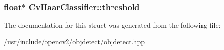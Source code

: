 \hypertarget{structCvHaarClassifier_ace474e46e89bd798e5b6876a0e7e7b49}{
\subsubsection[{threshold}]{\setlength{\rightskip}{0pt plus 5cm}float$\ast$ Cv\-Haar\-Classifier\-::threshold}}\label{structCvHaarClassifier_ace474e46e89bd798e5b6876a0e7e7b49}


The documentation for this struct was generated from the following file\-:\begin{DoxyCompactItemize}
\item 
/usr/include/opencv2/objdetect/\hyperlink{objdetect_8hpp}{objdetect.\-hpp}\end{DoxyCompactItemize}
